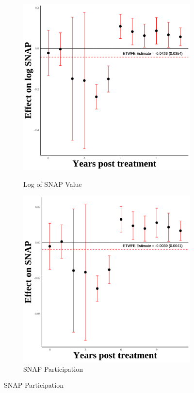 \documentclass[12pt,english]{article}
\begin{document}
\begin{figure}[H]
  \vspace{0.3cm} %

  \begin{subfigure}[b]{0.3\textwidth}
    \centering
    \caption{Log of SNAP Value}
    \includegraphics[width=\linewidth]{figures/plot92-ln_snap_event_study-fourth.png}
    \label{fig:ln-snap-fourth}
  \end{subfigure}
  \hfill
  \begin{subfigure}[b]{0.3\textwidth}
    \centering
    \caption{SNAP Participation}
    \includegraphics[width=\linewidth]{figures/plot93-snap_event_study-fourth.png}

\end{subfigure}
\end{figure}
\end{document}
